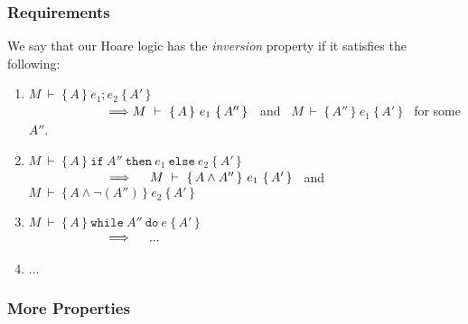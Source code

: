  \subsubsection{Requirements}
 
 \begin{definition}[Inversion] We say that our Hoare logic has the \emph{ inversion} property if it satisfies the  following:
 \begin{enumerate}
 \item
 $ M\ \vdash\  \{\, A \,  \}\ e_1; e_2 \  \{\, A' \, \}$\\
 $\strut \hspace{2cm}\ \Longrightarrow M\ \vdash\  \{\, A \,  \}\ e_1  \  \{\, A'' \, \}$ \ and \ $M\ \vdash\  \{\, A'' \,  \}\ e_1  \  \{\, A' \, \}$ \ for some $A''$.
 \item
 $ M\ \vdash\  \{\, A \,  \}\ \texttt{if}\ A''\ \texttt{then}\ e_1\ \texttt{else}\ e_2 \  \{\, A' \, \}$\\
 $\strut \hspace{2cm}\ \Longrightarrow
  \ \ \ \ M\ \vdash\  \{\, A\wedge A'' \,  \}\ e_1  \  \{\, A' \, \}$ \ and \ $M\ \vdash\  \{\, A\wedge \neg(A'') \,  \}\ e_2  \  \{\, A' \, \}$  
   \item
$ M\ \vdash\  \{\, A \,  \}\ \texttt{while}\ A''\ \texttt{do}\ e\  \{\, A' \, \}$\\
 $\strut \hspace{2cm}\ \Longrightarrow
  \ \ \ \ ... $  
   \item
...

 \end{enumerate}
 \end{definition}
 
 \subsubsection{More Properties}
 

